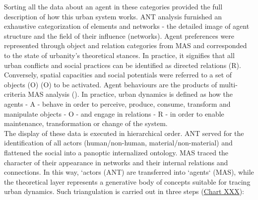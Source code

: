 \documentclass[11pt]{report}
\begin{document}
Sorting all the data about an agent in these categories provided the full description of how this urban system works. ANT analysis furnished an exhaustive categorization of elements and networks - the detailed image of agent structure and the field of their influence (networks). Agent preferences were represented through object and relation categories from MAS and corresponded to the state of urbanity’s theoretical stances. In practice, it signifies that all urban conflicts and social practices can be identified as directed relations (R). Conversely, spatial capacities and social potentials were referred to a set of objects (O) (O)	to be activated. Agent behaviours are the products of multi-criteria MAS analysis  (\href{Arsanjani}{\citealt{arsanjani_spatiotemporal_2013}}). In practice, urban dynamics is defined as how the agents - A - behave in order to perceive, produce, consume, transform and manipulate objects - O - and engage in relations - R - in order to enable maintenance, transformation or change of the system.
\\

The display of these data is executed in hierarchical order. ANT served for the identification of all actors (human/non-human, material/non-material) and flattened the social into a panoptic internalized ontology. MAS traced the character of their appearance in networks and their internal relations and connections. In this way, ‘actors (ANT) are transferred into ‘agents‘ (MAS), while the theoretical layer represents a generative body of concepts suitable for tracing urban dynamics. Such triangulation is carried out in three steps (\href{Table MAS structural analysos}{Chart XXX}):
\end{document}
